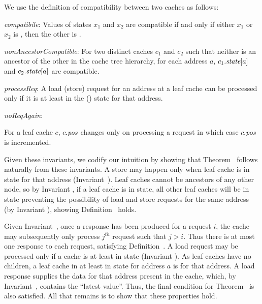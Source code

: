 We use the definition of compatibility between two caches as follows:
\begin{defn}
\textit{compatibile}: Values of states $x_1$ and $x_2$ are compatible if and only if
either $x_1$ or $x_2$ is \Mo{}, then the other is \In.
\label{compatible}
\end{defn}

\begin{inv}
\textit{nonAncestorCompatible}: For two distinct caches $c_1$ and $c_2$ such
that neither is an ancestor of the other in the cache tree hierarchy, for each
address $a$, $c_1.\textit{state}[a]$ and $c_2.\textit{state}[a]$ are compatible.
\label{nonAncestorCompatible}
\end{inv}

\begin{inv}
\textit{processReq}: A load (store) request for an address at a leaf cache can
be processed only if it is at least in the \Sh{} (\Mo) state for that address.
\label{processReq}
\end{inv}

\begin{inv}
\textit{noReqAgain}:
\item For a leaf cache $c$, $c.\textit{pos}$ changes only on processing a request in
which case $c.\textit{pos}$ is incremented.
\label{noReqAgain}
\end{inv}

Given these invariants, we codify our intuition by showing that
Theorem~ follows naturally from these
invariants.  A store may happen only when leaf cache is in \Mo{} state
for that address (Invariant~). Leaf caches cannot
be ancestors of any other node, so by Invariant
, if a leaf cache is in \Mo{} state, all
other leaf caches will be in \In{} state preventing the possibility of
load and store requests for the same address (by Invariant
), showing Definition~ holds.

Given Invariant~, once a response has been produced
for a request $i$, the cache may subsequently only process $j^{th}$
request such that $j > i$. Thus there is at most one response to each
request, satisfying Definition~. A load request
may be processed only if a cache is at least in \Sh{} state (Invariant
). As leaf caches have no children, a leaf cache in
at least in \Sh{} state for address $a$ is \clean for that address. A
load response supplies the data for that address present in the cache,
which, by Invariant~, contains the ``latest
value''. Thus, the final condition for Theorem~
is also satisfied. All that remains is to show that these properties hold.

